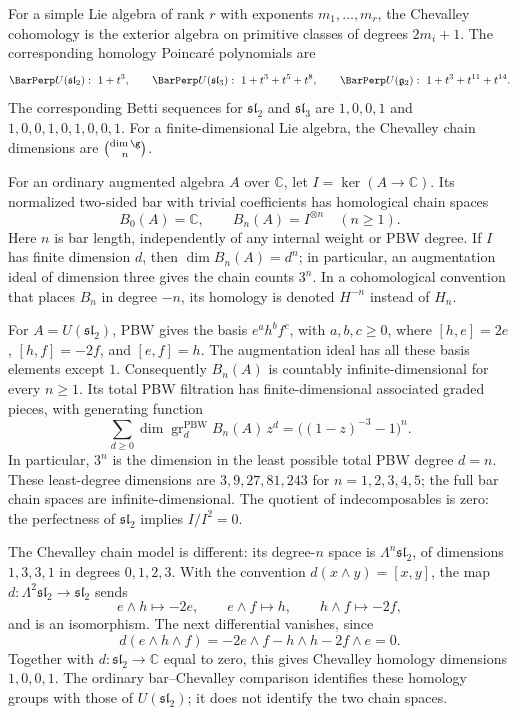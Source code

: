 \begin{calculation}
\label{calc:simple-spine}
For a simple Lie algebra of rank $r$ with exponents $m_1,\dots,m_r$, the
Chevalley cohomology is the exterior algebra on primitive classes of degrees
$2m_i+1$. The corresponding homology Poincar\'e polynomials are
\[
 \BarPerp U(\mathfrak{sl}_2):\ 1+t^3,
 \qquad
 \BarPerp U(\mathfrak{sl}_3):\ 1+t^3+t^5+t^8,
 \qquad
 \BarPerp U(\mathfrak g_2):\ 1+t^3+t^{11}+t^{14}.
\]
The corresponding Betti sequences for $\mathfrak{sl}_2$ and $\mathfrak{sl}_3$ are
$1,0,0,1$ and $1,0,0,1,0,1,0,0,1$.
For a finite-dimensional Lie algebra, the Chevalley chain dimensions are
$\binom{\dim\g}{n}$.

For an ordinary augmented algebra $A$ over $\mathbb C$, let
$I=\ker(A\to\mathbb C)$.  Its normalized two-sided bar with trivial
coefficients has homological chain spaces
\[
 B_0(A)=\mathbb C,\qquad B_n(A)=I^{\otimes n}\quad(n\ge1).
\]
Here $n$ is bar length, independently of any internal weight or PBW degree.
If $I$ has finite dimension $d$, then $\dim B_n(A)=d^n$; in particular,
an augmentation ideal of dimension three gives the chain counts $3^n$.
In a cohomological convention that places $B_n$ in degree $-n$, its homology
is denoted $H^{-n}$ instead of $H_n$.

For $A=U(\mathfrak{sl}_2)$, PBW gives the basis
$e^a h^b f^c$, with $a,b,c\ge0$, where
$[h,e]=2e$, $[h,f]=-2f$, and $[e,f]=h$.
The augmentation ideal has all these basis elements except $1$.
Consequently $B_n(A)$ is countably infinite-dimensional for every $n\ge1$.
Its total PBW filtration has finite-dimensional associated graded pieces,
with generating function
\[
 \sum_{d\ge0}\dim\operatorname{gr}^{\mathrm{PBW}}_d B_n(A)\,z^d
 =\bigl((1-z)^{-3}-1\bigr)^n.
\]
In particular, $3^n$ is the dimension in the least possible total PBW degree
$d=n$. These least-degree dimensions are $3,9,27,81,243$ for
$n=1,2,3,4,5$; the full bar chain spaces are infinite-dimensional. The quotient of
indecomposables is zero: the perfectness of $\mathfrak{sl}_2$ implies $I/I^2=0$.

The Chevalley chain model is different: its degree-$n$ space is
$\Lambda^n\mathfrak{sl}_2$, of dimensions $1,3,3,1$ in degrees $0,1,2,3$.
With the convention $d(x\wedge y)=[x,y]$, the map
$d:\Lambda^2\mathfrak{sl}_2\to\mathfrak{sl}_2$ sends
\[
 e\wedge h\longmapsto-2e,\qquad
 e\wedge f\longmapsto h,\qquad
 h\wedge f\longmapsto-2f,
\]
and is an isomorphism.  The next differential vanishes, since
\[
 d(e\wedge h\wedge f)
 =-2e\wedge f-h\wedge h-2f\wedge e=0.
\]
Together with $d:\mathfrak{sl}_2\to\mathbb C$ equal to zero, this gives
Chevalley homology dimensions $1,0,0,1$.  The ordinary bar--Chevalley
comparison identifies these homology groups with those of $U(\mathfrak{sl}_2)$;
it does not identify the two chain spaces.

\end{calculation}

